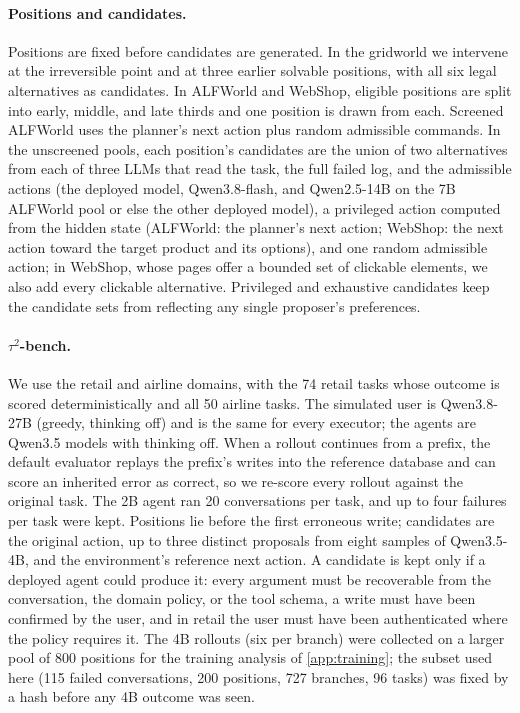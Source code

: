 \documentclass{article}
\newcommand{\tautwo}{$\tau^2$-bench}
\theoremstyle{plain}
\theoremstyle{definition}
\theoremstyle{remark}
\begin{document}
\paragraph{Positions and candidates.}
Positions are fixed before candidates are generated. In the gridworld we intervene at the irreversible point and at three earlier solvable positions, with all six legal alternatives as candidates. In ALFWorld and WebShop, eligible positions are split into early, middle, and late thirds and one position is drawn from each. Screened ALFWorld uses the planner's next action plus random admissible commands. In the unscreened pools, each position's candidates are the union of two alternatives from each of three LLMs that read the task, the full failed log, and the admissible actions (the deployed model, Qwen3.8-flash, and Qwen2.5-14B on the 7B ALFWorld pool or else the other deployed model), a privileged action computed from the hidden state (ALFWorld: the planner's next action; WebShop: the next action toward the target product and its options), and one random admissible action; in WebShop, whose pages offer a bounded set of clickable elements, we also add every clickable alternative. Privileged and exhaustive candidates keep the candidate sets from reflecting any single proposer's preferences.

\paragraph{\tautwo{}.}
We use the retail and airline domains, with the 74 retail tasks whose outcome is scored deterministically and all 50 airline tasks. The simulated user is Qwen3.8-27B (greedy, thinking off) and is the same for every executor; the agents are Qwen3.5 models with thinking off. When a rollout continues from a prefix, the default evaluator replays the prefix's writes into the reference database and can score an inherited error as correct, so we re-score every rollout against the original task. The 2B agent ran 20 conversations per task, and up to four failures per task were kept. Positions lie before the first erroneous write; candidates are the original action, up to three distinct proposals from eight samples of Qwen3.5-4B, and the environment's reference next action. A candidate is kept only if a deployed agent could produce it: every argument must be recoverable from the conversation, the domain policy, or the tool schema, a write must have been confirmed by the user, and in retail the user must have been authenticated where the policy requires it. The 4B rollouts (six per branch) were collected on a larger pool of 800 positions for the training analysis of \cref{app:training}; the subset used here (115 failed conversations, 200 positions, 727 branches, 96 tasks) was fixed by a hash before any 4B outcome was seen.
\end{document}
